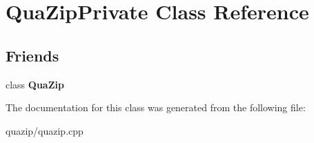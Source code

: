 \section{QuaZipPrivate Class Reference}
\label{classQuaZipPrivate}
\subsection*{Friends}
\begin{DoxyCompactItemize}
\item 
class {\bf QuaZip}\label{classQuaZipPrivate_a913fb7bbd3527119ebb8052d57132af2}

\end{DoxyCompactItemize}


The documentation for this class was generated from the following file:\begin{DoxyCompactItemize}
\item 
quazip/quazip.cpp\end{DoxyCompactItemize}
